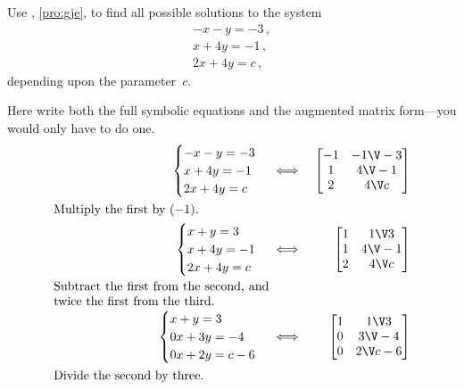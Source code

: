 \begin{example} \label{eg:gjea}
Use , \autoref{pro:gje}, to find all possible solutions to the system
\begin{equation*}
\begin{array}{l}
-x-y=-3\,,\\x+4y=-1\,,\\2x+4y=c\,,
\end{array}
\end{equation*}
depending upon the parameter~\(c\).

\begin{solution} 
Here write both the full symbolic equations and the augmented matrix form---you would only have to do one.
\begin{eqnarray*}
\begin{cases}
-x-y=-3\\x+4y=-1\\2x+4y=c
\end{cases}
&\iff&%
\begin{bmatrix} -1&-1\V-3\\1&4\V-1\\2&4\V c \end{bmatrix}
\\
\parbox{0.5\linewidth}{Multiply the first by~\((-1)\).}
\\
\begin{cases}
x+y=3\\x+4y=-1\\2x+4y=c
\end{cases}
&\iff&%
\begin{bmatrix} 1&1\V3\\1&4\V-1\\2&4\V c \end{bmatrix}
\\
\parbox{0.5\linewidth}{Subtract the first from the second, and twice the first from the third.}
\\
\begin{cases}
x+y=3\\0x+3y=-4\\0x+2y=c-6
\end{cases}
&\iff&%
\begin{bmatrix} 1&1\V3\\0&3\V-4\\0&2\V c-6 \end{bmatrix}
\\
\parbox{0.5\linewidth}{Divide the second by three.}
\\

\end{eqnarray*}
\end{solution}
\end{example}
